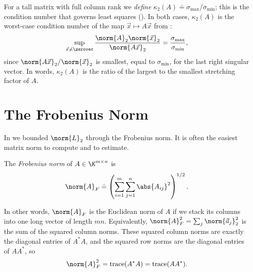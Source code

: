 For a tall matrix with full column rank we \emph{define} $\kappa_2(A) \doteq \sigma_{\max}/\sigma_{\min}$; this is the condition number that governs least squares (). In both cases, $\kappa_2(A)$ is the worst-case condition number of the map $\vec{x} \mapsto A\vec{x}$ from :
\begin{equation}
  \sup_{\vec{x} \ne \zerovec}\frac{\norm{A}_2\norm{\vec{x}}_2}{\norm{A\vec{x}}_2} = \frac{\sigma_{\max}}{\sigma_{\min}},
\end{equation}
since $\norm{A\vec{x}}_2/\norm{\vec{x}}_2$ is smallest, equal to $\sigma_{\min}$, for the last right singular vector. In words, $\kappa_2(A)$ is the ratio of the largest to the smallest stretching factor of $A$.

\section{The Frobenius Norm}
\label{sec:frobenius}

In  we bounded $\norm{L}_2$ through the Frobenius norm. It is often the easiest matrix norm to compute and to estimate.

\begin{definition}
  The \emph{Frobenius norm} of $A \in \K^{m \times n}$ is
  \begin{equation}
    \norm{A}_F \doteq \left(\sum_{i=1}^{m}\sum_{j=1}^{n}\abs{A_{ij}}^2\right)^{1/2}.
  \end{equation}
\end{definition}

In other words, $\norm{A}_F$ is the Euclidean norm of $A$ if we stack its columns into one long vector of length $mn$. Equivalently, $\norm{A}_F^2 = \sum_j\norm{\vec{a}_j}_2^2$ is the sum of the squared column norms. These squared column norms are exactly the diagonal entries of $A^\ast A$, and the squared row norms are the diagonal entries of $AA^\ast$, so
\begin{equation}
  \norm{A}_F^2 = \operatorname{trace}(A^\ast A) = \operatorname{trace}(AA^\ast).
\end{equation}

